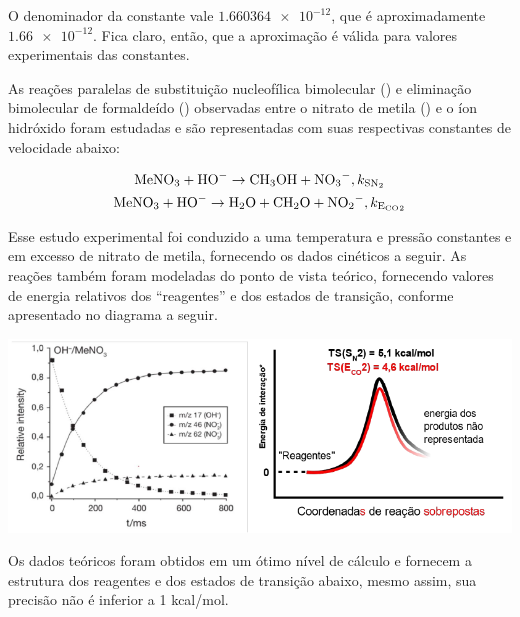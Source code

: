 \documentclass{IMTexam}
\begin{document}
\begin{questions}
\begin{parts}
\begin{solution}
                O denominador da constante vale $ \num{1,660364e-12} $, que é
                aproximadamente $ \num{1,66e-12}$. Fica claro, então, que a
                aproximação é válida para valores experimentais das constantes.
            \end{solution}

        \end{parts}

        \question As reações paralelas de substituição nucleofílica bimolecular
        () e eliminação bimolecular de formaldeído ()
        observadas entre o nitrato de metila () e o íon hidróxido
        foram estudadas e são representadas com suas respectivas constantes de
        velocidade abaixo:

        \begin{gather*}
            \ce{MeNO3}+\ce{HO-}\rightarrow \ce{CH3OH}+\ce{NO3-},k_{\ce{SN2}}\\
            \ce{MeNO3}+\ce{HO-}\rightarrow \ce{H2O}+\ce{CH2O}+\ce{NO2-},k_{\ce{E_{CO}2}}
        \end{gather*}

        Esse estudo experimental foi conduzido a uma temperatura e pressão
        constantes e em excesso de nitrato de metila, fornecendo os dados
        cinéticos a seguir. As reações também foram modeladas do ponto de vista
        teórico, fornecendo valores de energia relativos dos “reagentes” e dos
        estados de transição, conforme apresentado no diagrama a seguir.

        \begin{center}
            \includegraphics[width=\linewidth]{2021-08-01-12-33-20.png}
        \end{center}

        Os dados teóricos foram obtidos em um ótimo nível de cálculo e fornecem a
        estrutura dos reagentes e dos estados de transição abaixo, mesmo assim,
        sua precisão não é inferior a 1 kcal/mol.


\end{questions}
\end{document}
